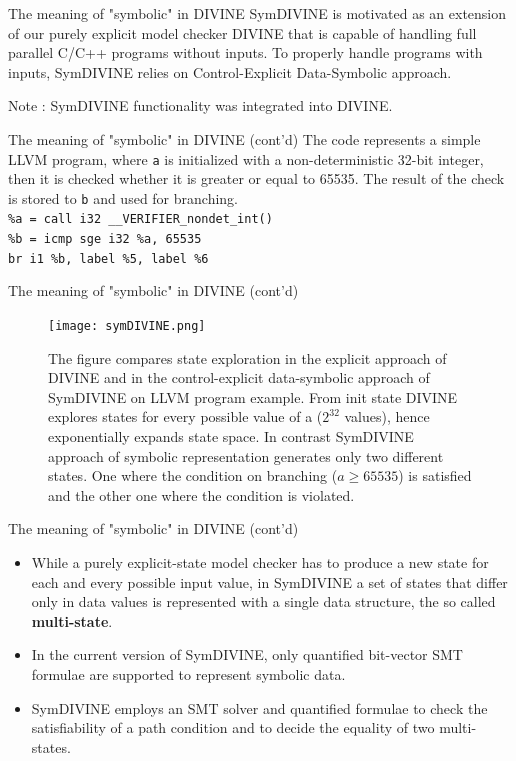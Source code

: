 \documentclass[12pt]{beamer}
\newcommand{\code}[1]{\texttt{#1}}
\begin{document}
\begin{frame}{The meaning of "symbolic" in DIVINE}
SymDIVINE is motivated as an extension of our purely explicit model
checker DIVINE that is capable of handling full parallel C/C++ programs without inputs. To properly handle programs with inputs, SymDIVINE relies on Control-Explicit Data-Symbolic approach.

\vspace{2cm}

Note : SymDIVINE functionality was integrated into DIVINE.
\end{frame}

\begin{frame}{The meaning of "symbolic" in DIVINE (cont'd)}
The code represents a simple LLVM program, where \code{a} is initialized with a non-deterministic 32-bit integer, then it is checked whether it is greater or equal to 65535. The result of the check is stored to \code{b} and used for branching.\\
\vspace{1.5cm}
\code{\%a = call i32 \@\_\_VERIFIER\_nondet\_int()}\\
\code{\%b = icmp sge i32 \%a, 65535}\\
\code{br i1 \%b, label \%5, label \%6}
\end{frame}

\captionsetup[figure]{font=scriptsize ,labelfont=scriptsize}
\begin{frame}{The meaning of "symbolic" in DIVINE (cont'd)}
    \begin{figure}
        \centering
        \texttt{[image: symDIVINE.png]}
        \caption{The figure compares state exploration in the explicit approach of DIVINE and in the control-explicit data-symbolic approach of SymDIVINE on LLVM program example. From init state DIVINE explores states for every possible value of a ($2^{32}$ values), hence exponentially expands state space. In contrast SymDIVINE approach of symbolic representation generates only two different states. One where the condition on branching ($a \geq 65535$) is satisfied and the other one where the condition is violated.}
    \end{figure}    
\end{frame}

\begin{frame}{The meaning of "symbolic" in DIVINE (cont'd)}
    \begin{itemize}
        \item While a purely explicit-state model checker has to produce a new state for each and every possible input value, in SymDIVINE a set of states that differ only in data values is represented with a single data structure, the so called \textbf{multi-state}.
        \item In the current version of SymDIVINE, only quantified bit-vector SMT formulae are supported to represent symbolic data.
        \item SymDIVINE employs an SMT solver and quantified formulae to check the satisfiability of a path condition and to decide the equality of two multi-states.
    \end{itemize}
\end{frame}
\end{document}
